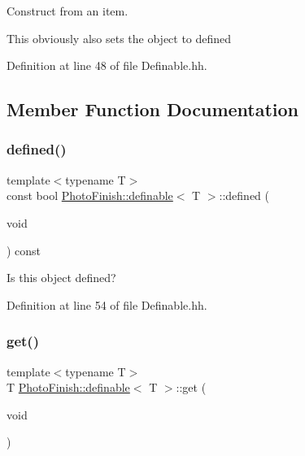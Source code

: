 Construct from an item. 

This obviously also sets the object to \textquotesingle{}defined\textquotesingle{} 

Definition at line 48 of file Definable.\+hh.



\subsection{Member Function Documentation}
\mbox{\label{class_photo_finish_1_1definable_a16e04c8c780e3f7cc669a9877ea2d0b2}} 
\subsubsection{\texorpdfstring{defined()}{defined()}}
{\footnotesize\ttfamily template$<$typename T$>$ \\
const bool \hyperlink{class_photo_finish_1_1definable}{Photo\+Finish\+::definable}$<$ T $>$\+::defined (\begin{DoxyParamCaption}\item[{void}]{ }\end{DoxyParamCaption}) const\hspace{0.3cm}{\ttfamily [inline]}}



Is this object defined? 



Definition at line 54 of file Definable.\+hh.

\mbox{\label{class_photo_finish_1_1definable_aafa6cc5bd59798b25e845c62600b50d6}} 
\subsubsection{\texorpdfstring{get()}{get()}\hspace{0.1cm}{\footnotesize\ttfamily [1/2]}}
{\footnotesize\ttfamily template$<$typename T$>$ \\
T \hyperlink{class_photo_finish_1_1definable}{Photo\+Finish\+::definable}$<$ T $>$\+::get (\begin{DoxyParamCaption}\item[{void}]{ }\end{DoxyParamCaption})\hspace{0.3cm}{\ttfamily [inline]}}




